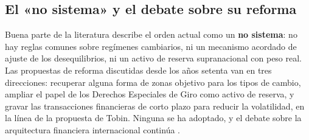\subsection{El «no sistema» y el debate sobre su reforma}

Buena parte de la literatura describe el orden actual como un \textbf{no
sistema}: no hay reglas comunes sobre regímenes cambiarios, ni un mecanismo
acordado de ajuste de los desequilibrios, ni un activo de reserva supranacional
con peso real. Las propuestas de reforma discutidas desde los años setenta van
en tres direcciones: recuperar alguna forma de zonas objetivo para los tipos de
cambio, ampliar el papel de los Derechos Especiales de Giro como activo de
reserva, y gravar las transacciones financieras de corto plazo para reducir la
volatilidad, en la línea de la propuesta de Tobin. Ninguna se ha adoptado, y el
debate sobre la arquitectura financiera internacional continúa
\parencite{requeijo2021,alonso2021}.
